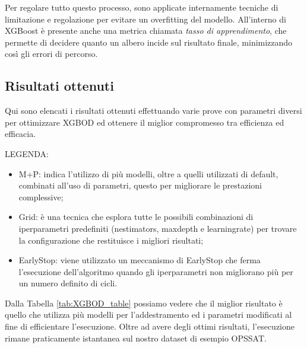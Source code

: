Per regolare tutto questo processo, sono applicate internamente tecniche di limitazione e regolazione per evitare un overfitting del modello. All'interno di XGBoost è presente anche una metrica chiamata \textit{tasso di apprendimento}, che permette di decidere quanto un albero incide sul risultato finale, minimizzando così gli errori di percorso.

\subsection{Risultati ottenuti}
Qui sono elencati i risultati ottenuti effettuando varie prove con parametri diversi per ottimizzare XGBOD ed ottenere il miglior compromesso tra efficienza ed efficacia.
\vspace{0.4cm}

\pagebreak

LEGENDA:
\begin{itemize}
    \item M+P: indica l'utilizzo di più modelli, oltre a quelli utilizzati di default,   combinati all'uso di parametri, questo per migliorare le prestazioni complessive;
    \item Grid: è una tecnica che esplora tutte le possibili combinazioni di iperparametri predefiniti (n\textunderscore estimators, max\textunderscore depth e learning\textunderscore rate) per trovare la configurazione che restituisce i migliori risultati;
    \item EarlyStop: viene utilizzato un meccanismo di EarlyStop che ferma l'esecuzione dell'algoritmo quando gli iperparametri non migliorano più per un numero definito di cicli.
\end{itemize}

Dalla Tabella \ref{tab:XGBOD_table} possiamo vedere che il miglior risultato è quello che utilizza più modelli per l'addestramento ed i parametri modificati al fine di efficientare l'esecuzione. Oltre ad avere degli ottimi risultati, l'esecuzione rimane praticamente istantanea sul nostro dataset di esempio OPS\textunderscore SAT.